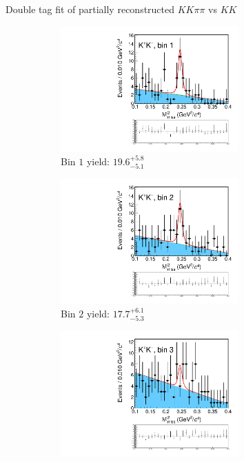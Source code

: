 \documentclass{beamer}
\begin{document}
\begin{frame}{Double tag fit of partially reconstructed $KK\pi\pi$ vs $KK$}
  \begin{figure}
    \centering
    \begin{subfigure}{0.5\textwidth}
      \centering
      \includegraphics[width=0.75\textwidth,trim={0 5cm 0 0},clip=true]{Plots/DoubleTagYield_DoubleTag_CP_KKpipi_vs_KKPartReco_SignalBin1.pdf}
      \caption{Bin $1$ yield: $19.6_{-5.1}^{+5.8}$}
    \end{subfigure}%
    \begin{subfigure}{0.5\textwidth}
      \centering
      \includegraphics[width=0.75\textwidth,trim={0 5cm 0 0},clip=true]{Plots/DoubleTagYield_DoubleTag_CP_KKpipi_vs_KKPartReco_SignalBin2.pdf}
      \caption{Bin $2$ yield: $17.7_{-5.3}^{+6.1}$}
    \end{subfigure}
    \begin{subfigure}{0.5\textwidth}
      \centering
      \includegraphics[width=0.75\textwidth,trim={0 5cm 0 0},clip=true]{Plots/DoubleTagYield_DoubleTag_CP_KKpipi_vs_KKPartReco_SignalBin3.pdf}

\end{subfigure}
\end{figure}
\end{frame}
\end{document}
